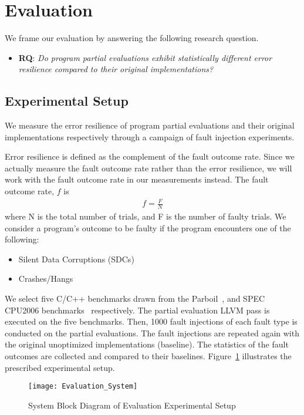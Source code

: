 \section{Evaluation}
\label{sec:evaluation}

We frame our evaluation by answering the following research question. 

\begin{itemize}
\item {\bf RQ}: \textit{Do program partial evaluations exhibit statistically different error resilience compared to their original implementations?}
\end{itemize}

\subsection{Experimental Setup}
\label{sec:exp.setup}

We measure the error resilience of program partial evaluations and their original implementations respectively through a campaign of fault injection experiments. 

Error resilience is defined as the complement of the fault outcome rate.
Since we actually measure the fault outcome rate rather than the error resilience, we will work with the fault outcome rate in our measurements instead.
The fault outcome rate, $f$ is 
\begin{align*}
f = \frac{F}{N}
\end{align*}
where N is the total number of trials, and F is the number of faulty trials.
We consider a program's outcome to be faulty if the program encounters one of the following:
\begin{itemize}
\item Silent Data Corruptions (SDCs) 
\item Crashes/Hangs
\end{itemize}


We select five C/C++ benchmarks drawn from the Parboil~\cite{Parboil}, and SPEC CPU2006 benchmarks~\cite{SPEC} respectively.
The partial evaluation LLVM pass is executed on the five benchmarks.
Then, 1000 fault injections of each fault type is conducted on the partial evaluations.
The fault injections are repeated again with the original unoptimized implementations (baseline).
The statistics of the fault outcomes are collected and compared to their baselines. 
Figure~\ref{fig:evaluation_sys} illustrates the prescribed experimental setup.

\begin{figure}[htbp]
  \centering
  \texttt{[image: Evaluation\_System]}
  \caption{System Block Diagram of Evaluation Experimental Setup}
  \label{fig:evaluation_sys}
\end{figure}


